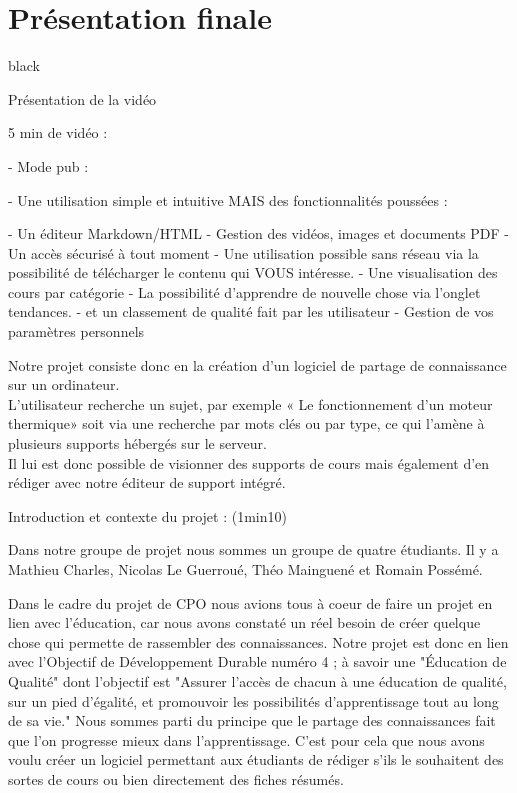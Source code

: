{%


\chapter{Présentation finale}

\begin{items}{black}{\Bullet}
\item Présentation de la vidéo

5 min de vidéo : 

- Mode pub : 

- Une utilisation simple et intuitive MAIS des fonctionnalités poussées : 

- Un éditeur Markdown/HTML
- Gestion des vidéos, images et documents PDF
- Un accès sécurisé à tout moment
- Une utilisation possible sans réseau via la possibilité de télécharger le contenu qui VOUS intéresse.
- Une visualisation des cours par catégorie
- La possibilité d'apprendre de nouvelle chose via l'onglet tendances.
- et un classement de qualité fait par les utilisateur
- Gestion de vos paramètres personnels


Notre projet consiste donc en la création d’un logiciel de partage de connaissance sur un ordinateur.\\
L’utilisateur recherche un sujet, par exemple « Le fonctionnement d'un moteur thermique» soit via une recherche par mots clés ou par type, ce qui l’amène à plusieurs supports hébergés sur le serveur.\\
Il lui est donc possible de visionner des supports de cours mais également d'en rédiger avec notre éditeur de support intégré.

\item Introduction et contexte du projet : (1min10)

Dans notre groupe de projet nous sommes un groupe de quatre étudiants. Il y a Mathieu Charles, Nicolas Le Guerroué, Théo Mainguené et Romain Possémé. 

Dans le cadre du projet de CPO nous avions tous à coeur de faire un projet en lien avec l'éducation, car nous avons constaté un réel besoin de créer quelque chose qui permette de rassembler des connaissances. Notre projet est donc en lien avec l'Objectif de Développement Durable numéro 4 ; à savoir une "Éducation de Qualité" dont l'objectif est "Assurer l'accès de chacun à une éducation de qualité, sur un pied d'égalité, et promouvoir les possibilités d'apprentissage tout au long de sa vie."
Nous sommes parti du principe que le partage des connaissances fait que l'on progresse mieux dans l'apprentissage. C'est pour cela que nous avons voulu créer un logiciel permettant aux étudiants de rédiger s'ils le souhaitent des sortes de cours ou bien directement des fiches résumés. 


\end{items}}
